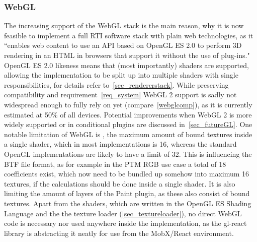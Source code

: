 \subsubsection*{WebGL}
The increasing support of the WebGL stack is the main reason, why
  it is now feasible to implement a full RTI software stack with plain web
  technologies, as it ``enables web content to use an API based on OpenGL ES 2.0
  to perform 3D rendering in an HTML  in browsers that support it
  without the use of plug-ins."\cite*{noauthor_webgl_nodate-1} OpenGL ES 2.0
  likeness means that (most importantly) shaders are supported, allowing the
  implementation to be split up into multiple shaders with single
  responsibilities, for details refer to~\autoref{sec_rendererstack}. While preserving compatibility and
  requirement~\ref{req_system} WebGL 2 support is sadly not widespread enough to fully rely on yet
  (compare~\autoref{webglcomp}), as it is currently estimated at 50\% of all devices\cite*{noauthor_webgl_nodate-2}.
    Potential improvements
  when WebGL 2 is more widely supported or in conditional plugins are discussed
  in~\autoref{sec_futureGL}. One notable limitation of WebGL is
  , the maximum amount of bound textures inside a
  single shader, which in most implementations is
  16\cite*{noauthor_webgl_nodate-3}, whereas the standard OpenGL implementations
  are likely to have a limit of 32. This is influencing the BTF file format, as
  for example in the PTM RGB use case a total of 18 coefficients exist, which
  now need to be bundled up somehow into maximum 16 textures, if the
  calculations should be done inside a single shader. It is also limiting the
  amount of layers of the Paint plugin, as these also consist of bound textures.
  Apart from the shaders, which are written in the OpenGL ES
  Shading Language\cite*{noauthor_webgl_nodate-4} and the the texture loader (\autoref{sec_textureloader}), no direct
  WebGL code is necessary nor used anywhere inside the implementation, as the
  gl-react library is abstracting it neatly for use from the MobX/React environment.

